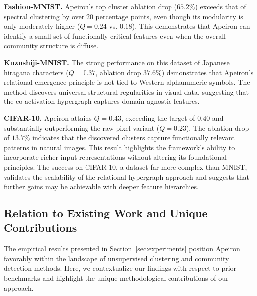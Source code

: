 \textbf{Fashion-MNIST.} Apeiron's top cluster ablation drop ($65.2\%$) exceeds that of spectral clustering by over $20$ percentage points, even though its modularity is only moderately higher ($Q = 0.24$ vs. $0.18$). This demonstrates that Apeiron can identify a small set of functionally critical features even when the overall community structure is diffuse.

\textbf{Kuzushiji-MNIST.} The strong performance on this dataset of Japanese hiragana characters ($Q = 0.37$, ablation drop $37.6\%$) demonstrates that Apeiron's relational emergence principle is not tied to Western alphanumeric symbols. The method discovers universal structural regularities in visual data, suggesting that the co-activation hypergraph captures domain-agnostic features.

\textbf{CIFAR-10.} Apeiron attains $Q = 0.43$, exceeding the target of $0.40$ and substantially outperforming the raw‑pixel variant ($Q = 0.23$). The ablation drop of $13.7\%$ indicates that the discovered clusters capture functionally relevant patterns in natural images. This result highlights the framework's ability to incorporate richer input representations without altering its foundational principles. The success on CIFAR‑10, a dataset far more complex than MNIST, validates the scalability of the relational hypergraph approach and suggests that further gains may be achievable with deeper feature hierarchies.

\subsection{Relation to Existing Work and Unique Contributions}

The empirical results presented in Section~\ref{sec:experiments} position Apeiron favorably within the landscape of unsupervised clustering and community detection methods. Here, we contextualize our findings with respect to prior benchmarks and highlight the unique methodological contributions of our approach.

